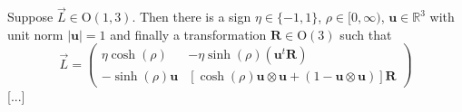 \begin{theorem}
    Suppose \(\vec{L} \in \mathrm{O}(1,3) \). Then there is a sign \(\eta \in \{-1, 1\}\), \(\rho \in [0, \infty)\), \(\mathbf{u} \in \mathbb{R}^3\) with unit norm \(\vert \mathbf{u} \vert = 1\) and finally a transformation \(\mathbf{R} \in \mathrm{O}(3)\) such that
    \[
        \vec{L} = \begin{pmatrix}
            \eta \cosh(\rho)         & - \eta \sinh(\rho) (\mathbf{u}^t \mathbf{R})                                                              \\
            - \sinh(\rho) \mathbf{u} & \left[ \cosh(\rho) \mathbf{u} \otimes \mathbf{u} + (1 - \mathbf{u} \otimes \mathbf{u}) \right] \mathbf{R}
        \end{pmatrix}
    \]
    [...]
\end{theorem}

